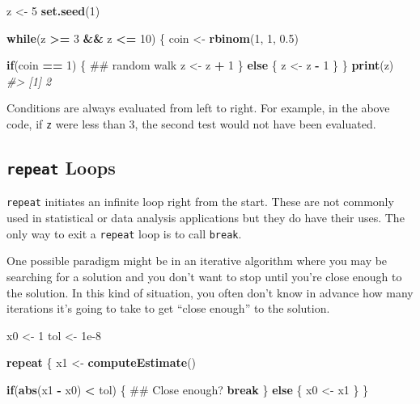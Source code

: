 \documentclass[]{book}
\newenvironment{Shaded}{\begin{snugshade}}{\end{snugshade}}
\newcommand{\KeywordTok}[1]{\textcolor[rgb]{0.13,0.29,0.53}{\textbf{#1}}}
\newcommand{\DecValTok}[1]{\textcolor[rgb]{0.00,0.00,0.81}{#1}}
\newcommand{\FloatTok}[1]{\textcolor[rgb]{0.00,0.00,0.81}{#1}}
\newcommand{\StringTok}[1]{\textcolor[rgb]{0.31,0.60,0.02}{#1}}
\newcommand{\CommentTok}[1]{\textcolor[rgb]{0.56,0.35,0.01}{\textit{#1}}}
\newcommand{\ControlFlowTok}[1]{\textcolor[rgb]{0.13,0.29,0.53}{\textbf{#1}}}
\newcommand{\OperatorTok}[1]{\textcolor[rgb]{0.81,0.36,0.00}{\textbf{#1}}}
\newcommand{\NormalTok}[1]{#1}
\theoremstyle{definition}
\theoremstyle{definition}
\theoremstyle{definition}
\theoremstyle{remark}
\begin{document}
\begin{Shaded}
\begin{Highlighting}[]
\NormalTok{z <-}\StringTok{ }\DecValTok{5}
\KeywordTok{set.seed}\NormalTok{(}\DecValTok{1}\NormalTok{)}

\ControlFlowTok{while}\NormalTok{(z }\OperatorTok{>=}\StringTok{ }\DecValTok{3} \OperatorTok{&&}\StringTok{ }\NormalTok{z }\OperatorTok{<=}\StringTok{ }\DecValTok{10}\NormalTok{) \{}
\NormalTok{        coin <-}\StringTok{ }\KeywordTok{rbinom}\NormalTok{(}\DecValTok{1}\NormalTok{, }\DecValTok{1}\NormalTok{, }\FloatTok{0.5}\NormalTok{)}
        
        \ControlFlowTok{if}\NormalTok{(coin }\OperatorTok{==}\StringTok{ }\DecValTok{1}\NormalTok{) \{  ## random walk}
\NormalTok{                z <-}\StringTok{ }\NormalTok{z }\OperatorTok{+}\StringTok{ }\DecValTok{1}
\NormalTok{        \} }\ControlFlowTok{else}\NormalTok{ \{}
\NormalTok{                z <-}\StringTok{ }\NormalTok{z }\OperatorTok{-}\StringTok{ }\DecValTok{1}
\NormalTok{        \} }
\NormalTok{\}}
\KeywordTok{print}\NormalTok{(z)}
\CommentTok{#> [1] 2}
\end{Highlighting}
\end{Shaded}

Conditions are always evaluated from left to right. For example, in the
above code, if \texttt{z} were less than 3, the second test would not
have been evaluated.

\subsection{\texorpdfstring{\texttt{repeat}
Loops}{repeat Loops}}\label{repeat-loops}

\texttt{repeat} initiates an infinite loop right from the start. These
are not commonly used in statistical or data analysis applications but
they do have their uses. The only way to exit a \texttt{repeat} loop is
to call \texttt{break}.

One possible paradigm might be in an iterative algorithm where you may
be searching for a solution and you don't want to stop until you're
close enough to the solution. In this kind of situation, you often don't
know in advance how many iterations it's going to take to get ``close
enough'' to the solution.

\begin{Shaded}
\begin{Highlighting}[]
\NormalTok{x0 <-}\StringTok{ }\DecValTok{1}
\NormalTok{tol <-}\StringTok{ }\FloatTok{1e-8}

\ControlFlowTok{repeat}\NormalTok{ \{}
\NormalTok{        x1 <-}\StringTok{ }\KeywordTok{computeEstimate}\NormalTok{()}
        
        \ControlFlowTok{if}\NormalTok{(}\KeywordTok{abs}\NormalTok{(x1 }\OperatorTok{-}\StringTok{ }\NormalTok{x0) }\OperatorTok{<}\StringTok{ }\NormalTok{tol) \{  ## Close enough?}
                \ControlFlowTok{break}
\NormalTok{        \} }\ControlFlowTok{else}\NormalTok{ \{}
\NormalTok{                x0 <-}\StringTok{ }\NormalTok{x1}
\NormalTok{        \} }
\NormalTok{\}}
\end{Highlighting}
\end{Shaded}
\end{document}
